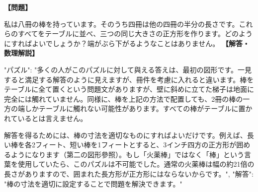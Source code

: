 \documentclass[10pt,a4paper,oneside,openany]{ltjsbook}
\begin{document}
\begin{tcolorbox}[colback=softblue,colframe=primaryblue,title=\textbf{第 198 問：THE EIGHT STICKS.},arc=2mm,boxrule=1pt,breakable]
\textbf{【問題】}\par\vspace{0.3em}
私は八冊の棒を持っています。そのうち四冊は他の四冊の半分の長さです。これらのすべてをテーブルに並べ、三つの同じ大きさの正方形を作ります。どのようにすればよいでしょうか？端がぶら下がるようなことはありません。
\tcblower
\textbf{【解答・数理解説】}\par\vspace{0.3em}
{
  "パズル": "多くの人がこのパズルに対して與える答えは、最初の図形です。一見すると満足する解答のように見えますが、冊件を考慮に入れると違います。棒をテーブルに全て置くという問題文がありますが、壁に斜めに立てた梯子は地面に完全には觸れていません。同様に、棒を上記の方法で配置しても、2冊の棒の一方の端しかテーブルに觸れない可能性があります。すべての棒がテーブルに置かれているとは言えません。

解答を得るためには、棒の寸法を適切なものにすればよいだけです。例えば、長い棒を各2フィート、短い棒を1フィートとすると、3インチ四方の正方形が囲めるようになります（第二の図形參照）。もし「火薬棒」ではなく「棒」という言葉を使用していたら、このパズルは不可能でした。通常の火薬棒は幅の約21倍の長さがありますので、囲まれた長方形が正方形にはならないからです。",
  "解答": "棒の寸法を適切に設定することで問題を解決できます。"
}
\end{tcolorbox}
\end{document}
